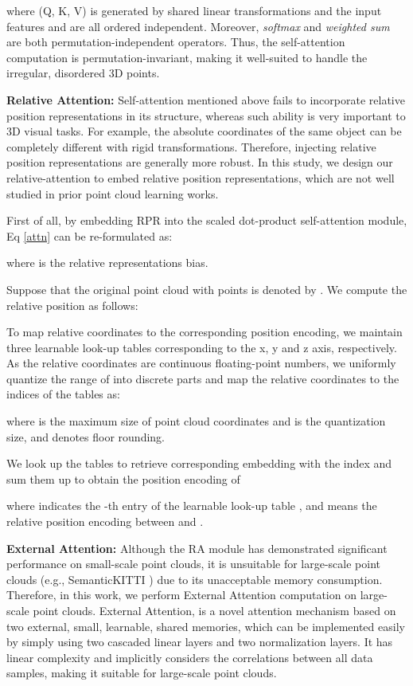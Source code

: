 \documentclass[10pt,twocolumn,letterpaper]{article}
\begin{document}
where (Q, K, V)  is generated by shared linear transformations and the input features  and are all ordered independent. Moreover, \emph{softmax} and \emph{weighted sum} are both permutation-independent operators. Thus, the self-attention computation is permutation-invariant, making it well-suited to handle the irregular, disordered 3D points.

\textbf{Relative Attention:} Self-attention mentioned above fails to incorporate relative position representations in its structure, whereas such ability is very important to 3D visual tasks. For example, the absolute coordinates of the same object can be completely different with rigid transformations. Therefore, injecting relative position representations are generally more robust.
In this study, we design our relative-attention to embed relative position representations, which are not well studied in prior point cloud learning works.

First of all, by embedding RPR into the scaled dot-product self-attention module, Eq \ref{attn} can be re-formulated as:

where  is the relative representations bias. 

Suppose that the original point cloud with  points is denoted by . We compute the relative position  as follows:


To map relative coordinates to the corresponding position encoding, we maintain three learnable look-up tables  corresponding to the x, y and z axis, respectively. As the relative coordinates are continuous floating-point numbers, we uniformly quantize the range of  into  discrete parts and map the relative coordinates  to the indices of the tables as:

where  is the maximum size of point cloud coordinates and  is the quantization size, and  denotes floor rounding.

We look up the tables to retrieve corresponding embedding with the index and sum them up to obtain the position encoding of

where  indicates the -th entry of the learnable look-up table , and  means the relative position encoding between  and .

\textbf{External Attention:} 
Although the RA module has demonstrated significant performance on small-scale point clouds, it is unsuitable for large-scale point clouds (e.g., SemanticKITTI \cite{semanticKT}) due to its unacceptable  memory consumption. Therefore, in this work, we perform External Attention computation on large-scale point clouds. External Attention, is a novel attention mechanism based on two external, small, learnable, shared memories, which can be implemented easily by simply using two cascaded linear layers and two normalization layers. It has linear complexity and implicitly considers the correlations between all data samples, making it suitable for large-scale point clouds. 
\end{document}
